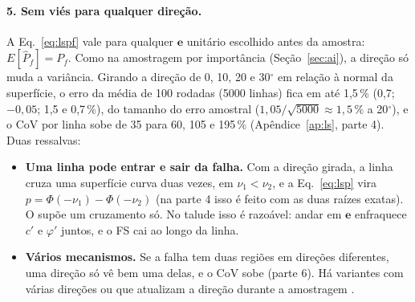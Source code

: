 \documentclass[11pt,a4paper]{article}
\begin{document}
\paragraph{5. Sem viés para qualquer direção.} A Eq.~\eqref{eq:lspf} vale para qualquer $\bm e$ unitário escolhido antes
da amostra: $E[\hat P_f] = P_f$. Como na amostragem por importância (Seção~\ref{sec:ai}), a direção só muda a variância.
Girando a direção de 0, 10, 20 e 30$^\circ$ em relação à normal da superfície, o erro da média de 100 rodadas (5000 linhas) fica
em até 1,5\,\% (0,7; $-0{,}05$; 1,5 e 0,7\,\%), do tamanho do erro amostral ($1{,}05/\sqrt{5000} \approx 1{,}5\,\%$ a
20$^\circ$), e o CoV por linha sobe de 35 para 60, 105 e 195\,\% (Apêndice~\ref{ap:ls}, parte 4). Duas ressalvas:
\begin{itemize}
  \item \textbf{Uma linha pode entrar e sair da falha.} Com a direção girada, a linha cruza uma superfície curva duas
    vezes, em $\nu_1 < \nu_2$, e a Eq.~\eqref{eq:lsp} vira $p = \Phi(-\nu_1) - \Phi(-\nu_2)$ (na parte 4 isso é feito com as
    duas raízes exatas). O  supõe um cruzamento só. No talude isso é razoável: andar em $\bm e$
    enfraquece $c'$ e $\varphi'$ juntos, e o FS cai ao longo da linha.
  \item \textbf{Vários mecanismos.} Se a falha tem duas regiões em direções diferentes, uma direção só vê bem uma delas,
    e o CoV sobe (parte 6). Há variantes com várias direções \citep{papaioannou2021} ou que atualizam a direção durante a
    amostragem \citep{deangelis2015}.
\end{itemize}
\end{document}
